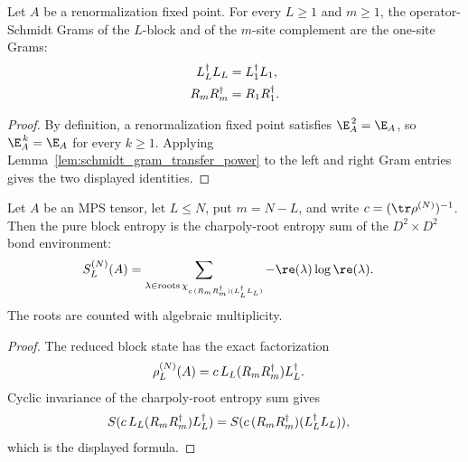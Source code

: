 \begin{lemma}
    \label{lem:rfp_schmidt_gram_collapse}
    \leanok
    Let $A$ be a renormalization fixed point. For every $L\ge1$ and
    $m\ge1$, the operator-Schmidt Grams of the $L$-block and of the
    $m$-site complement are the one-site Grams:
    \begin{align}
        L_L^\dagger L_L & =L_1^\dagger L_1,
        \notag                              \\
        R_mR_m^\dagger  & =R_1R_1^\dagger.
        \notag
    \end{align}
\end{lemma}
\begin{proof}\leanok
    By definition, a renormalization fixed point satisfies
    $\E_A^{\,2}=\E_A$, so $\E_A^{\,k}=\E_A$ for
    every $k\ge1$. Applying Lemma~\ref{lem:schmidt_gram_transfer_power} to the
    left and right Gram entries gives the two displayed identities.
\end{proof}

\begin{lemma}
    \label{lem:pure_block_entropy_env_charpoly}
    \leanok
    Let $A$ be an MPS tensor, let $L\le N$, put $m=N-L$, and write
    $c=(\tr\rho^{(N)})^{-1}$. Then the pure block entropy is the
    charpoly-root entropy sum of the $D^2\times D^2$ bond environment:
    \begin{align}
        S_L^{(N)}(A)
         & =
        \sum_{\lambda\in
            \operatorname{roots}\chi_{c\,(R_mR_m^\dagger)(L_L^\dagger L_L)}}
        -\re(\lambda)\log\re(\lambda).
        \notag
    \end{align}
    The roots are counted with algebraic multiplicity.
\end{lemma}
\begin{proof}\leanok
    The reduced block state has the exact factorization
    \begin{align}
        \rho_L^{(N)}(A)
         & =
        c\,L_L(R_mR_m^\dagger)L_L^\dagger.
        \notag
    \end{align}
    Cyclic invariance of the charpoly-root entropy sum gives
    \begin{align}
        S(c\,L_L(R_mR_m^\dagger)L_L^\dagger)
         & =
        S(c\,(R_mR_m^\dagger)(L_L^\dagger L_L)),
        \notag
    \end{align}
    which is the displayed formula.
\end{proof}

